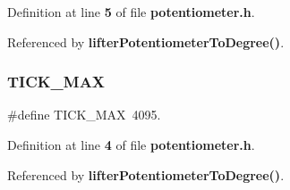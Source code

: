 Definition at line \textbf{ 5} of file \textbf{ potentiometer.\+h}.



Referenced by \textbf{ lifter\+Potentiometer\+To\+Degree()}.

\mbox{\label{potentiometer_8h_ad40f2bbc4e57baed2d9e900750d94a7f}} 
\subsubsection{T\+I\+C\+K\+\_\+\+M\+AX}
{\footnotesize\ttfamily \#define T\+I\+C\+K\+\_\+\+M\+AX~4095.}



Definition at line \textbf{ 4} of file \textbf{ potentiometer.\+h}.



Referenced by \textbf{ lifter\+Potentiometer\+To\+Degree()}.

